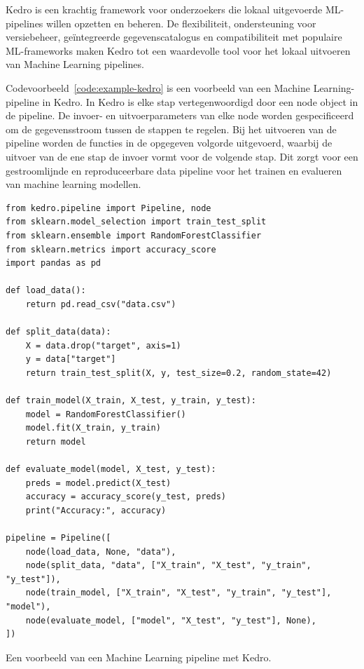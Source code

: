 Kedro is een krachtig framework voor onderzoekers die lokaal uitgevoerde ML-pipelines willen opzetten en beheren. De flexibiliteit, ondersteuning voor versiebeheer, geïntegreerde gegevenscatalogus en compatibiliteit met populaire ML-frameworks maken Kedro tot een waardevolle tool voor het lokaal uitvoeren van Machine Learning pipelines.

Codevoorbeeld~\ref{code:example-kedro} is een voorbeeld van een Machine Learning-pipeline in Kedro. In Kedro is elke stap vertegenwoordigd door een node object in de pipeline. De invoer- en uitvoerparameters van elke node worden gespecificeerd om de gegevensstroom tussen de stappen te regelen. Bij het uitvoeren van de pipeline worden de functies in de opgegeven volgorde uitgevoerd, waarbij de uitvoer van de ene stap de invoer vormt voor de volgende stap. Dit zorgt voor een gestroomlijnde en reproduceerbare data pipeline voor het trainen en evalueren van machine learning modellen.

\begin{listing}
\begin{verbatim}
from kedro.pipeline import Pipeline, node
from sklearn.model_selection import train_test_split
from sklearn.ensemble import RandomForestClassifier
from sklearn.metrics import accuracy_score
import pandas as pd

def load_data():
    return pd.read_csv("data.csv")

def split_data(data):
    X = data.drop("target", axis=1)
    y = data["target"]
    return train_test_split(X, y, test_size=0.2, random_state=42)

def train_model(X_train, X_test, y_train, y_test):
    model = RandomForestClassifier()
    model.fit(X_train, y_train)
    return model

def evaluate_model(model, X_test, y_test):
    preds = model.predict(X_test)
    accuracy = accuracy_score(y_test, preds)
    print("Accuracy:", accuracy)

pipeline = Pipeline([
    node(load_data, None, "data"),
    node(split_data, "data", ["X_train", "X_test", "y_train", "y_test"]),
    node(train_model, ["X_train", "X_test", "y_train", "y_test"], "model"),
    node(evaluate_model, ["model", "X_test", "y_test"], None),
])
\end{verbatim}
\caption[Voorbeeld van een Machine Learning pipeline met Kedro.]{\label{code:example-kedro}Een voorbeeld van een Machine Learning pipeline met Kedro.}
\end{listing}

